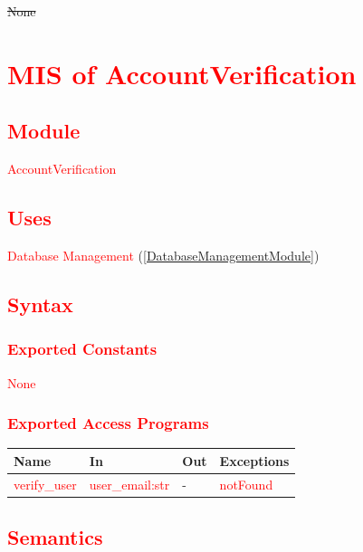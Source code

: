 \documentclass[12pt, titlepage]{article}
\begin{document}
\sout{None}

\newpage

\section{\textcolor{red}{MIS of AccountVerification}} \label{AdminControlPanelModule}

\subsection{\textcolor{red}{Module}}

\textcolor{red}{AccountVerification}

\subsection{\textcolor{red}{Uses}}


\textcolor{red}{Database Management} (\ref{DatabaseManagementModule})

\subsection{\textcolor{red}{Syntax}}

\subsubsection{\textcolor{red}{Exported Constants}}

\textcolor{red}{None}

\subsubsection{\textcolor{red}{Exported Access Programs}}

\begin{center}
\begin{tabular}{p{4cm} p{4cm} p{4cm} p{2cm}}
\hline
\textbf{Name} & \textbf{In} & \textbf{Out} & \textbf{Exceptions} \\
\hline
\textcolor{red}{verify\_user} & \textcolor{red}{user\_email:str} & - & \textcolor{red}{notFound} \\
\hline
\end{tabular}
\end{center}

\subsection{\textcolor{red}{Semantics}}
\end{document}

